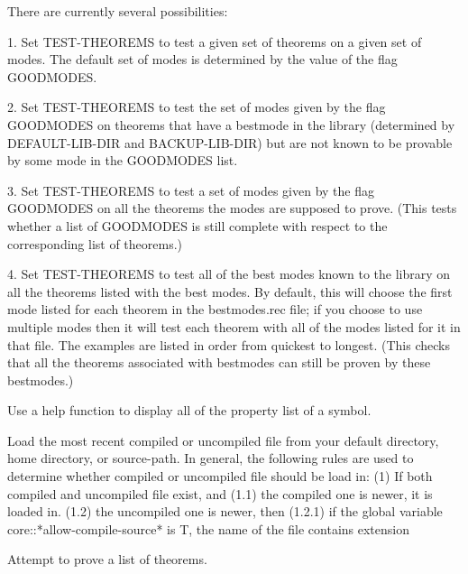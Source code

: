 \begin{description}
There are currently several possibilities:

1.  Set TEST-THEOREMS to test a given set of theorems on
a given set of modes.  The default set of modes is determined
by the value of the flag GOODMODES.

2.  Set TEST-THEOREMS to test the set of modes given by the flag
GOODMODES on theorems that have a bestmode in the library
(determined by DEFAULT-LIB-DIR and BACKUP-LIB-DIR) but are not 
known to be provable by some mode in the GOODMODES list.

3.  Set TEST-THEOREMS to test a set of modes given by the flag
GOODMODES on all the theorems the modes are supposed to prove.
(This tests whether a list of GOODMODES is still complete 
with respect to the corresponding list of theorems.)

4. Set TEST-THEOREMS to test all of the best
modes known to the library on all the theorems listed with
the best modes. By default, this will choose the first
mode listed for each theorem in the bestmodes.rec file; if you
choose to use multiple modes then it will test each theorem
with all of the modes listed for it in that file.  The examples
are listed in order from quickest to longest.
(This checks that all the theorems associated with bestmodes 
can still be proven by these bestmodes.)

\item[\parbox{\textwidth}{TLIST \textit{symbol}}]  
Use a help function to display all of the property list of a symbol.

\item[\parbox{\textwidth}{TLOAD \textit{filespec}}]  
Load the most recent compiled or uncompiled file from your default
directory, home directory, or source-path. In general, the following rules are
used to determine whether compiled or uncompiled file should be load in:
(1) If both compiled and uncompiled file exist, and 
    (1.1) the compiled one is newer, it is loaded in.
    (1.2) the uncompiled one is newer, then
          (1.2.1) if the global variable core::*allow-compile-source* is T, the
                  name of the file contains extension 

\item[\parbox{\textwidth}{TPS-TEST \textit{stop-on-success} \textit{mate-only} \textit{record} \textit{moderec} \textit{quiet-run} \textit{expu} \textit{newcore} \textit{modify} \textit{output} \textit{timing} \textit{testwin}}]  
Attempt to prove a list of theorems.


\end{description}
